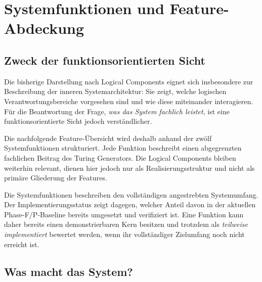
\section{Systemfunktionen und Feature-Abdeckung}
\label{sec:systemfunktionen_featureabdeckung}

\subsection{Zweck der funktionsorientierten Sicht}

Die bisherige Darstellung nach Logical Components eignet sich insbesondere zur
Beschreibung der inneren Systemarchitektur: Sie zeigt, welche logischen
Verantwortungsbereiche vorgesehen sind und wie diese miteinander interagieren.
Für die Beantwortung der Frage, \emph{was das System fachlich leistet}, ist eine
funktionsorientierte Sicht jedoch verständlicher.

Die nachfolgende Feature-Übersicht wird deshalb anhand der zwölf
Systemfunktionen strukturiert. Jede Funktion beschreibt einen abgegrenzten
fachlichen Beitrag des Turing Generators. Die Logical Components bleiben
weiterhin relevant, dienen hier jedoch nur als Realisierungsstruktur und nicht
als primäre Gliederung der Features.

\begin{tcolorbox}[
  enhanced,
  breakable,
  colback=blue!3,
  colframe=TuringBlue,
  title={Lesart der folgenden Darstellung},
  fonttitle=\bfseries,
  boxrule=0.8pt,
  arc=2mm
]
Die Systemfunktionen beschreiben den vollständigen angestrebten Systemumfang.
Der Implementierungsstatus zeigt dagegen, welcher Anteil davon in der
aktuellen Phase-F/P-Baseline bereits umgesetzt und verifiziert ist. Eine
Funktion kann daher bereits einen demonstrierbaren Kern besitzen und trotzdem
als \emph{teilweise implementiert} bewertet werden, wenn ihr vollständiger
Zielumfang noch nicht erreicht ist.
\end{tcolorbox}

\subsection{Was macht das System?}

